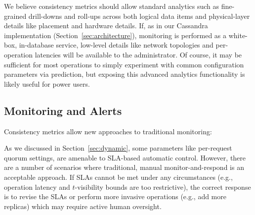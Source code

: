 We believe consistency metrics should allow standard analytics such as
fine-grained drill-downs and roll-ups across both logical data items
and physical-layer details like placement and hardware details. If, as
in our Cassandra implementation (Section~\ref{sec:architecture}),
monitoring is performed as a white-box, in-database service, low-level
details like network topologies and per-operation latencies will be
available to the administrator. Of course, it may be sufficient for most
operations to simply experiment with common configuration parameters via
prediction, but exposing this advanced analytics functionality is
likely useful for power users.

\subsection{Monitoring and Alerts}
\label{sec:monitoring}

Consistency metrics allow new approaches to traditional monitoring:


As we discussed in Section~\ref{sec:dynamic}, some parameters like
per-request quorum settings, are amenable to SLA-based automatic
control. However, there are a number of scenarios where traditional,
manual monitor-and-respond is an acceptable approach. If SLAs cannot
be met under any circumstances (e.g., operation latency and
$t$-visibility bounds are too restrictive), the correct response is to
revise the SLAs or perform more invasive operations (e.g., add more
replicas) which may require active human oversight.
